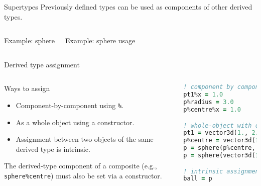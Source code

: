 \begin{frame}[fragile]{Supertypes}
  Previously defined types can be used as components of other derived types.
\begin{columns}[T,onlytextwidth]
  \begin{block}{Example: sphere}
    
  \end{block}

    \begin{block}{Example: sphere usage}
    
  \end{block}
  \end{columns}
\end{frame}


\begin{frame}[fragile]{Derived type assignment}
  \begin{columns}[T]
    \begin{block}{Ways to assign}
      \begin{itemize}
        \item Component-by-component using \texttt{\%}.
        \item As a whole object using a constructor.
        \item Assignment between two objects of the same derived type is intrinsic.
      \end{itemize}
      The derived-type component of a composite (e.g., \texttt{sphere\%centre}) must also be set via a constructor.
    \end{block}

\begin{lstlisting}[language=Fortran]
! component by component
pt1%x = 1.0
p%radius = 3.0
p%centre%x = 1.0

! whole-object with constructors
pt1 = vector3d(1., 2., 3.)
p%centre = vector3d(1., 2., 3.)
p = sphere(p%centre, 10.)
p = sphere(vector3d(1.,2.,3.), 10.)

! intrinsic assignment between objects
ball = p
\end{lstlisting}
  \end{columns}
\end{frame}

